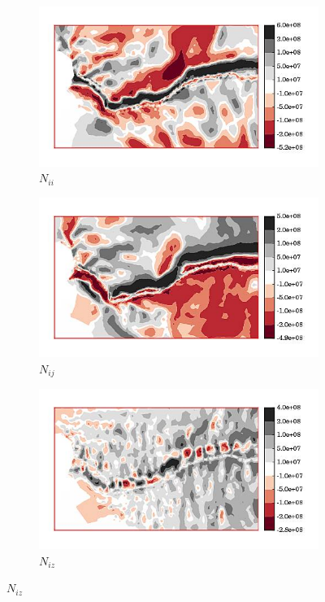 \begin{figure}
  
  \centering
  
  \begin{subfigure}[b]{0.32\linewidth}
    \includegraphics[width=\linewidth]{images/internal_energy/jakob_results/inversion_Wc_0.01/stress_balance/N_ii.jpg}
  \caption{$N_{ii}$}
  \label{N_ii}
  \end{subfigure}
  \begin{subfigure}[b]{0.32\linewidth}
    \includegraphics[width=\linewidth]{images/internal_energy/jakob_results/inversion_Wc_0.01/stress_balance/N_ij.jpg}
  \caption{$N_{ij}$}
  \label{N_ij}
  \end{subfigure}
  \begin{subfigure}[b]{0.32\linewidth}
    \includegraphics[width=\linewidth]{images/internal_energy/jakob_results/inversion_Wc_0.01/stress_balance/N_iz.jpg}
  \caption{$N_{iz}$}
  \label{N_iz}
  \end{subfigure}


\end{figure}
